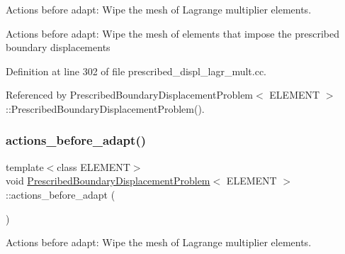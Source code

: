 Actions before adapt\+: Wipe the mesh of Lagrange multiplier elements. 

Actions before adapt\+: Wipe the mesh of elements that impose the prescribed boundary displacements 

Definition at line 302 of file prescribed\+\_\+displ\+\_\+lagr\+\_\+mult.\+cc.



Referenced by Prescribed\+Boundary\+Displacement\+Problem$<$ E\+L\+E\+M\+E\+N\+T $>$\+::\+Prescribed\+Boundary\+Displacement\+Problem().

\mbox{\label{classPrescribedBoundaryDisplacementProblem_a2e9f335e8680b0f2338b579e37e9d38a}} 
\subsubsection{\texorpdfstring{actions\+\_\+before\+\_\+adapt()}{actions\_before\_adapt()}\hspace{0.1cm}{\footnotesize\ttfamily [2/2]}}
{\footnotesize\ttfamily template$<$class E\+L\+E\+M\+E\+NT$>$ \\
void \hyperlink{classPrescribedBoundaryDisplacementProblem}{Prescribed\+Boundary\+Displacement\+Problem}$<$ E\+L\+E\+M\+E\+NT $>$\+::actions\+\_\+before\+\_\+adapt (\begin{DoxyParamCaption}{ }\end{DoxyParamCaption})}



Actions before adapt\+: Wipe the mesh of Lagrange multiplier elements. 

\mbox{\label{classPrescribedBoundaryDisplacementProblem_ad2184bb8d7391da21bec62d4aacf5c20}} 

